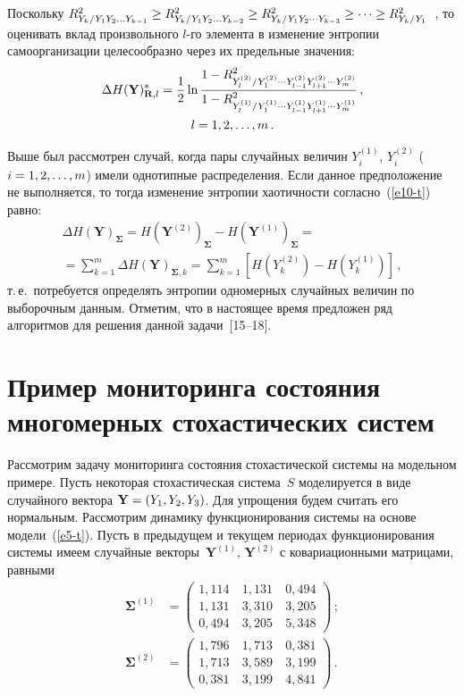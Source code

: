 \begin{multicols}{2}
  Поскольку $R^2_{Y_k/Y_1Y_2\ldots Y_{k-1}}\hm\geq 
R^2_{Y_k/Y_1Y_2\ldots Y_{k-2}} \hm\geq R^2_{Y_k/Y_1Y_2\cdots Y_{k-3}}\geq 
\cdots \geq R^2_{Y_k/Y_1}$~\cite{12-t}, то оценивать вклад произвольного 
  $l$-го элемента в изменение энтропии самоорганизации целесообразно через 
их предельные значения:
  \begin{multline*}
  \Delta H(\mathbf{Y})^*_{\mathbf{R},l} = \displaystyle\frac{\displaystyle 1\mathstrut}{\displaystyle 2\mathstrut}\ln 
  \displaystyle\frac{\displaystyle 1- R^2_{Y_l^{(2)}/Y_1^{(2)}\cdots Y_{l-1}^{(2)}Y_{l+1}^{(2)}\cdots Y_m^{(2)}}\mathstrut}{\displaystyle 1-R^2_{Y_l^{(1)}/Y_1^{(1)}\cdots Y_{l-1}^{(1)}Y_{l+1}^{(1)}\cdots Y_m^{(1)}}\mathstrut}\,,\\ 
l=1,2,\ldots ,m\,.
  \end{multline*}
  
  Выше был рассмотрен случай, когда пары случайных величин $Y_i^{(1)}$, 
$Y_i^{(2)}$ ($i\hm=1,2,\ldots ,m$) имели однотипные распределения. Если 
данное предположение не выполняется, то тогда изменение энтропии 
хаотичности согласно~(\ref{e10-t}) равно:
  \begin{multline*}
  \Delta H(\mathbf{Y})_{\boldsymbol{\Sigma}}= H\left(\mathbf{Y}^{(2)}\right)_{\boldsymbol{\Sigma}} - 
H\left(\mathbf{Y}^{(1)}\right)_{\boldsymbol{\Sigma}} ={}\\
{}=\sum\limits_{k=1}^m \Delta 
H(\mathbf{Y})_{\boldsymbol{\Sigma},k} = \sum\limits_{k=1}^m \left[ H\left(Y_k^{(2)}\right)-H 
\left(Y_k^{(1)}\right)\right]\,,
  \end{multline*}
т.\,е.\ потребуется определять энтропии одномерных случайных величин по 
выборочным данным. Отметим, что в настоящее время предложен ряд 
алгоритмов для решения данной задачи~[15--18].
  
  \section{Пример мониторинга состояния многомерных 
стохастических систем}
  
  Рассмотрим задачу мониторинга состояния стохастической системы на 
модельном примере. Пусть некоторая стохастическая система~$S$ 
моделируется в виде случайного вектора $\mathbf{Y}\hm= (Y_1,Y_2,Y_3)$. Для 
упрощения будем считать его нормальным. Рассмотрим динамику 
функционирования системы на основе модели~(\ref{e5-t}). Пусть в 
предыдущем и текущем периодах функционирования системы имеем 
случайные векторы~$\mathbf{Y}^{(1)}$, $\mathbf{Y}^{(2)}$ с 
ковариационными матрицами, равными
  \begin{align*}
\boldsymbol{\Sigma}^{(1)} &=\begin{pmatrix}
  1{,}114 &\ 1{,}131 &\ 0{,}494\\
  1{,}131 &\ 3{,}310&\ 3{,}205\\
  0{,}494 &\ 3{,}205 &\ 5{,}348
  \end{pmatrix}\,;\\[6pt]
\boldsymbol{\Sigma}^{(2)} &= \begin{pmatrix}
  1{,}796 &\ 1{,}713 &\ 0{,}381\\
  1{,}713 &\ 3{,}589&\ 3{,}199\\
  0{,}381&\ 3{,}199&\ 4{,}841 \end{pmatrix}\,.
  \end{align*}
  

\end{multicols}
